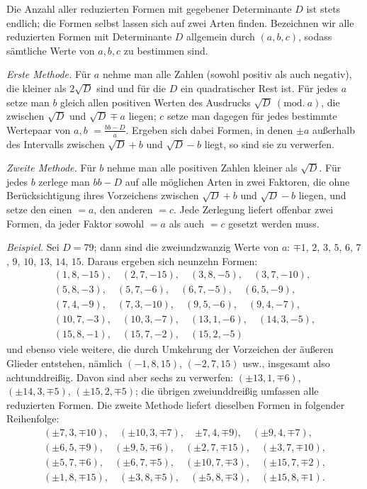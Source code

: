 Die Anzahl aller reduzierten Formen mit gegebener Determinante $D$ ist stets endlich; die Formen selbst lassen sich auf zwei Arten finden. Bezeichnen wir alle reduzierten Formen mit Determinante $D$ allgemein durch $(a,b,c)$, sodass sämtliche Werte von $a,b,c$ zu bestimmen sind.

\textit{Erste Methode.} Für $a$ nehme man alle Zahlen (sowohl positiv als auch negativ), die kleiner als $2\surd D$ sind und für die $D$ ein quadratischer Rest ist. Für jedes $a$ setze man $b$ gleich allen positiven Werten des Ausdrucks $\surd D\ (\mathrm{mod.}\ a)$, die zwischen $\surd D$ und $\surd D\mp a$ liegen; $c$ setze man dagegen für jedes bestimmte Wertepaar von $a,b$ $=\frac{bb-D}{a}$. Ergeben sich dabei Formen, in denen $\pm a$ außerhalb des Intervalls zwischen $\surd D+b$ und $\surd D-b$ liegt, so sind sie zu verwerfen.

\textit{Zweite Methode.} Für $b$ nehme man alle positiven Zahlen kleiner als $\surd D$. Für jedes $b$ zerlege man $bb-D$ auf alle möglichen Arten in zwei Faktoren, die ohne Berücksichtigung ihres Vorzeichens zwischen $\surd D+b$ und $\surd D-b$ liegen, und setze den einen $=a$, den anderen $=c$. Jede Zerlegung liefert offenbar zwei Formen, da jeder Faktor sowohl $=a$ als auch $=c$ gesetzt werden muss.
\par
{}
\textit{Beispiel.} Sei $D=79$; dann sind die zweiundzwanzig Werte von $a$: ${\mp1}$, $2$, $3$, $5$, $6$, $7$, $9$, $10$, $13$, $14$, $15$. Daraus ergeben sich neunzehn Formen:
\[
\begin{gathered}
(1,8,-15),\quad (2,7,-15),\quad {(3,8,-5)},\quad (3,7,-10),\\
(5,8,-3),\quad (5,7,-6),\quad (6,7,-5),\quad (6,5,-9),\\
(7,4,-9),\quad (7,3,-10),\quad (9,5,-6),\quad (9,4,-7),\\
(10,7,-3),\quad (10,3,-7),\quad (13,1,-6),\quad (14,3,-5),\\
(15,8,-1),\quad (15,7,-2),\quad (15,2,-5)
\end{gathered}
\]
und ebenso viele weitere, die durch Umkehrung der Vorzeichen der äußeren Glieder entstehen, nämlich $(-1,8,15)$, $(-2,7,15)$ usw., insgesamt also achtunddreißig. Davon sind aber sechs zu verwerfen: $(\pm13,1,\mp6)$, $(\pm14,3,\mp5)$, $(\pm15,2,\mp5)$; die übrigen zweiunddreißig umfassen alle reduzierten Formen. Die zweite Methode liefert dieselben Formen in folgender Reihenfolge:
\[
\begin{gathered}
(\pm7,3,\mp10),\quad (\pm10,3,\mp7),\quad {\pm7,4,\mp9)},\quad (\pm9,4,\mp7),\\
(\pm6,5,\mp9),\quad (\pm9,5,\mp6),\quad (\pm2,7,\mp15),\quad (\pm3,7,\mp10),\\
(\pm5,7,\mp6),\quad (\pm6,7,\mp5),\quad (\pm10,7,\mp3),\quad (\pm15,7,\mp2),\\
(\pm1,8,\mp15),\quad (\pm3,8,\mp5),\quad (\pm5,8,\mp3),\quad (\pm15,8,\mp1).
\end{gathered}
\]

